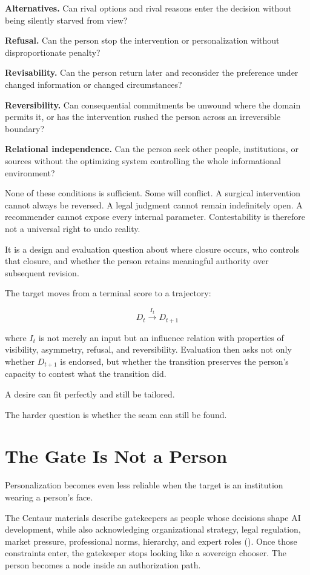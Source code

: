 \documentclass[
  10.5pt,
  letterpaper,
]{article}
\begin{document}
\textbf{Alternatives.} Can rival options and rival reasons enter the
decision without being silently starved from view?

\textbf{Refusal.} Can the person stop the intervention or
personalization without disproportionate penalty?

\textbf{Revisability.} Can the person return later and reconsider the
preference under changed information or changed circumstances?

\textbf{Reversibility.} Can consequential commitments be unwound where
the domain permits it, or has the intervention rushed the person across
an irreversible boundary?

\textbf{Relational independence.} Can the person seek other people,
institutions, or sources without the optimizing system controlling the
whole informational environment?

None of these conditions is sufficient. Some will conflict. A surgical
intervention cannot always be reversed. A legal judgment cannot remain
indefinitely open. A recommender cannot expose every internal parameter.
Contestability is therefore not a universal right to undo reality.

It is a design and evaluation question about where closure occurs, who
controls that closure, and whether the person retains meaningful
authority over subsequent revision.

The target moves from a terminal score to a trajectory:

\[
D_t \xrightarrow{I_t} D_{t+1}
\]

where \(I_t\) is not merely an input but an influence relation with
properties of visibility, asymmetry, refusal, and reversibility.
Evaluation then asks not only whether \(D_{t+1}\) is endorsed, but
whether the transition preserves the person's capacity to contest what
the transition did.

A desire can fit perfectly and still be tailored.

The harder question is whether the seam can still be found.

\section{The Gate Is Not a Person}\label{the-gate-is-not-a-person}

Personalization becomes even less reliable when the target is an
institution wearing a person's face.

The Centaur materials describe gatekeepers as people whose decisions
shape AI development, while also acknowledging organizational strategy,
legal regulation, market pressure, professional norms, hierarchy, and
expert roles (). Once those constraints enter, the gatekeeper stops looking like
a sovereign chooser. The person becomes a node inside an authorization
path.
\end{document}
